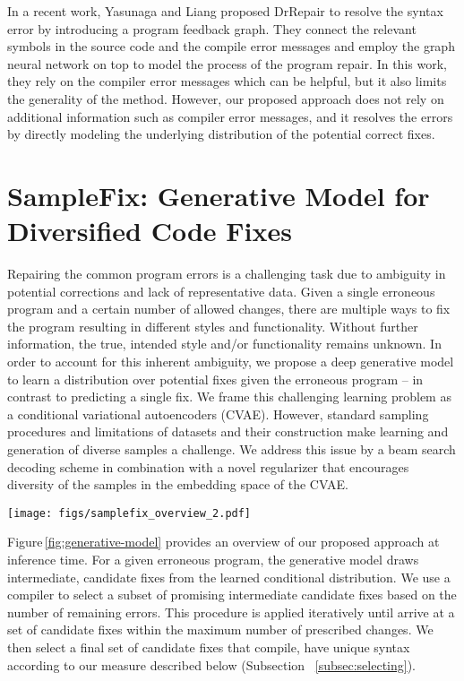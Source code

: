 \documentclass[runningheads]{llncs}
\newcommand{\figref}{Figure}
\begin{document}
In a recent work, Yasunaga and Liang \cite{yasunaga2020repair} proposed DrRepair to resolve the syntax error by introducing a program feedback graph. They connect the relevant symbols in the source code and the compile error messages and employ the graph neural network on top to model the process of the program repair. In this work, they rely on the compiler error messages which can be helpful, but it also limits the generality of the method. However, our proposed approach does not rely on additional information such as compiler error messages, and it resolves the errors by directly modeling the underlying distribution of the potential correct fixes. 


\section{SampleFix: Generative Model for Diversified Code Fixes} 
Repairing the common program errors is a challenging task due to ambiguity in potential corrections and lack of representative data. Given a single erroneous program and a certain number of allowed changes, there are multiple ways to fix the program resulting in different styles and functionality. Without further information, the true, intended style and/or functionality remains unknown. In order to account for this inherent ambiguity, we propose a deep generative model to learn a distribution over potential fixes given the erroneous program -- in contrast to predicting a single fix. We frame this challenging learning problem as a conditional variational autoencoders (CVAE).
However, standard sampling procedures and limitations of datasets and their construction make learning and generation of diverse samples a challenge. We address this issue by a beam search decoding scheme in combination with a novel regularizer that encourages diversity of the samples in the embedding space of the CVAE.

\begin{figure*}[h] 
	\centering
	    \centering
		\texttt{[image: figs/samplefix\_overview\_2.pdf]}
	
	\caption{Overview of SampleFix at inference time, highlighting the generation of diverse fixes.}
	\label{fig:generative-model}
\end{figure*}
\figref \,\ref{fig:generative-model} provides an overview of our proposed approach at inference time. 
For a given erroneous program, the generative model draws  intermediate, candidate fixes  from the learned conditional distribution. We use a compiler to select a subset of promising intermediate candidate fixes based on the number of remaining errors. This procedure is applied iteratively until arrive at a set of candidate fixes within the maximum number of prescribed changes. We then select a final set of candidate fixes that compile, have unique syntax according to our measure described below (Subsection ~\ref{subsec:selecting}).
\end{document}

